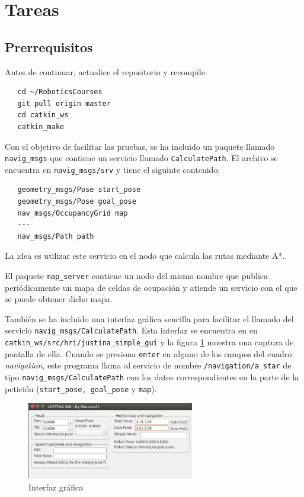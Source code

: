 \documentclass[letterpaper,12pt]{article}
\begin{document}
\section{Tareas}

\subsection{Prerrequisitos}
Antes de continuar, actualice el repositorio y recompile:
\begin{verbatim}
   cd ~/RoboticsCourses
   git pull origin master
   cd catkin_ws
   catkin_make
\end{verbatim}

Con el objetivo de facilitar las pruebas, se ha incluido un paquete llamado \texttt{navig\_msgs} que contiene un servicio llamado \texttt{CalculatePath}. El archivo se encuentra en \texttt{navig\_msgs/srv} y tiene el siguinte contenido:
\begin{verbatim}
   geometry_msgs/Pose start_pose
   geometry_msgs/Pose goal_pose
   nav_msgs/OccupancyGrid map
   ---
   nav_msgs/Path path
\end{verbatim}
La idea es utilizar este servicio en el nodo que calcula las rutas mediante A*. 

El paquete \texttt{map\_server} contiene un nodo del mismo nombre que publica periódicamente un mapa de celdas de ocupación y atiende un servicio con el que se puede obtener dicho mapa. 

También se ha incluido una interfaz gráfica sencilla para facilitar el llamado del servicio \texttt{navig\_msgs/CalculatePath}. Esta interfaz se encuentra en en \texttt{catkin\_ws/src/hri/justina\_simple\_gui} y la figura \ref{fig:gui} muestra una captura de pantalla de ella. Cuando se presiona \texttt{enter} en alguno de los campos del cuadro \textit{navigation}, este programa llama al servicio de nombre \texttt{/navigation/a\_star} de tipo \texttt{navig\_msgs/CalculatePath} con los datos correspondientes en la parte de la petición (\texttt{start\_pose, goal\_pose} y \texttt{map}).
\begin{figure}
\centering
\includegraphics[width=0.65\textwidth]{Figures/gui.jpg}
\caption{Interfaz gráfica}
\label{fig:gui}
\end{figure}
\end{document}
